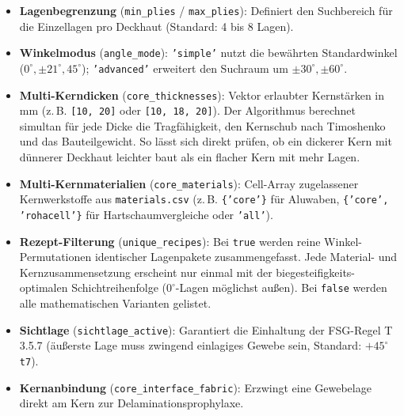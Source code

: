 \begin{itemize}
    \item \textbf{Lagenbegrenzung} (\texttt{min\_plies} / \texttt{max\_plies}): Definiert den Suchbereich für die Einzellagen pro Deckhaut (Standard: 4 bis 8 Lagen).
    \item \textbf{Winkelmodus} (\texttt{angle\_mode}): \texttt{'simple'} nutzt die bewährten Standardwinkel ($0^\circ, \pm 21^\circ, 45^\circ$); \texttt{'advanced'} erweitert den Suchraum um $\pm 30^\circ, \pm 60^\circ$.
    \item \textbf{Multi-Kerndicken} (\texttt{core\_thicknesses}): Vektor erlaubter Kernstärken in $\text{mm}$ (z.\,B. \texttt{[10, 20]} oder \texttt{[10, 18, 20]}). Der Algorithmus berechnet simultan für jede Dicke die Tragfähigkeit, den Kernschub nach Timoshenko und das Bauteilgewicht. So lässt sich direkt prüfen, ob ein dickerer Kern mit dünnerer Deckhaut leichter baut als ein flacher Kern mit mehr Lagen.
    \item \textbf{Multi-Kernmaterialien} (\texttt{core\_materials}): Cell-Array zugelassener Kernwerkstoffe aus \texttt{materials.csv} (z.\,B. \texttt{\{'core'\}} für Aluwaben, \texttt{\{'core', 'rohacell'\}} für Hartschaumvergleiche oder \texttt{'all'}).
    \item \textbf{Rezept-Filterung} (\texttt{unique\_recipes}): Bei \texttt{true} werden reine Winkel-Permutationen identischer Lagenpakete zusammengefasst. Jede Material- und Kernzusammensetzung erscheint nur einmal mit der biegesteifigkeits-optimalen Schichtreihenfolge ($0^\circ$-Lagen möglichst außen). Bei \texttt{false} werden alle mathematischen Varianten gelistet.
    \item \textbf{Sichtlage} (\texttt{sichtlage\_active}): Garantiert die Einhaltung der FSG-Regel T\,3.5.7 (äußerste Lage muss zwingend einlagiges Gewebe sein, Standard: $+45^\circ$ \texttt{t7}).
    \item \textbf{Kernanbindung} (\texttt{core\_interface\_fabric}): Erzwingt eine Gewebelage direkt am Kern zur Delaminationsprophylaxe.
\end{itemize}

\clearpage

